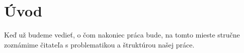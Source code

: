 \chapter*{Úvod} %

Keď už budeme vedieť, o čom nakoniec práca bude, na tomto
mieste stručne zoznámime čitateľa s problematikou a štruktúrou
našej práce.
